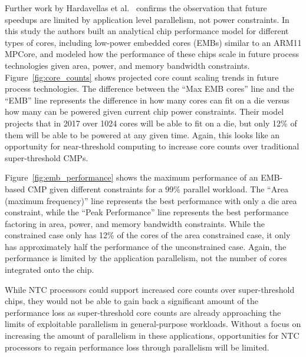Further work by Hardavellas et al.~\cite{Hardavellas:2011de} confirms the observation that future speedups are limited by application level parallelism, not power constraints.
In this study the authors built an analytical chip performance model for different types of cores, including low-power embedded cores (EMBs) similar to an ARM11 MPCore, and modeled how the performance of these chips scale in future process technologies given area, power, and memory bandwidth constraints.
Figure~\ref{fig:core_counts} shows projected core count scaling trends in future process technologies.
The difference between the ``Max EMB cores'' line and the ``EMB'' line represents the difference in how many cores can fit on a die versus how many can be powered given current chip power constraints.
Their model projects that in 2017 over 1024 cores will be able to fit on a die, but only 12\% of them will be able to be powered at any given time.
Again, this looks like an opportunity for near-threshold computing to increase core counts over traditional super-threshold CMPs.

Figure~\ref{fig:emb_performance} shows the maximum performance of an EMB-based CMP given different constraints for a 99\% parallel workload.
The ``Area (maximum frequency)'' line represents the best performance with only a die area constraint, while the ``Peak Performance'' line represents the best performance factoring in area, power, and memory bandwidth constraints.
While the constrained case only has 12\% of the cores of the area constrained case, it only has approximately half the performance of the unconstrained case.
Again, the performance is limited by the application parallelism, not the number of cores integrated onto the chip.

While NTC processors could support increased core counts over super-threshold chips, they would not be able to gain back a significant amount of the performance loss as super-threshold core counts are already approaching the limits of exploitable parallelism in general-purpose workloads.
Without a focus on increasing the amount of parallelism in these applications, opportunities for NTC processors to regain performance loss through parallelism will be limited.
